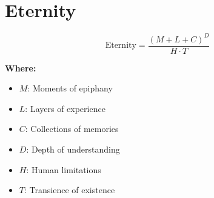 \chapter{Eternity}

\begin{equation}
\text{Eternity} = \frac{{(M + L + C)^D}}{{H \cdot T}}
\end{equation}

\textbf{Where:}

\begin{itemize}
    \item $M$: Moments of epiphany
    \item $L$: Layers of experience 
    \item $C$: Collections of memories
    \item $D$: Depth of understanding
    \item $H$: Human limitations
    \item $T$: Transience of existence
\end{itemize}